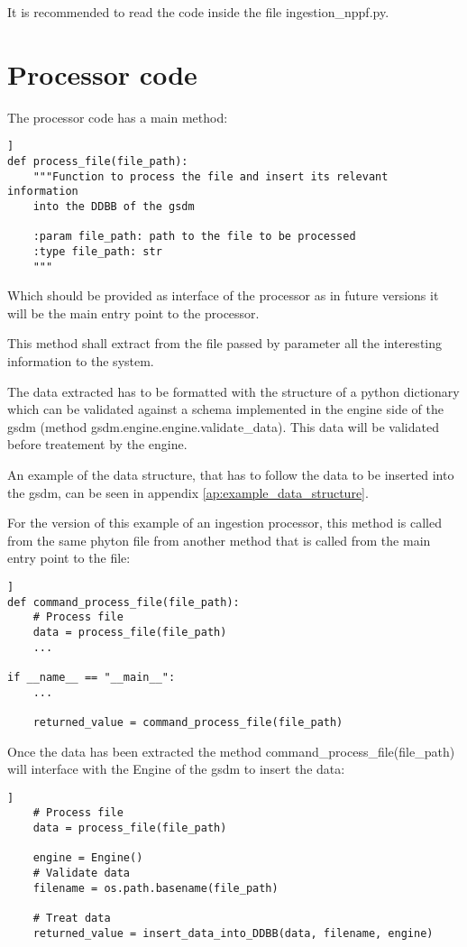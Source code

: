 It is recommended to read the code inside the file ingestion\_nppf.py.

\section{Processor code}

The processor code has a main method:

\begin{lstlisting}[breaklines=true, style=python]]
def process_file(file_path):
    """Function to process the file and insert its relevant information
    into the DDBB of the gsdm

    :param file_path: path to the file to be processed
    :type file_path: str
    """
\end{lstlisting}

Which should be provided as interface of the processor as in future versions it will be the main entry point to the processor.

This method shall extract from the file passed by parameter all the interesting information to the system.

The data extracted has to be formatted with the structure of a python dictionary which can be validated against a schema implemented in the engine side of the gsdm (method gsdm.engine.engine.validate\_data). This data will be validated before treatement by the engine.

An example of the data structure, that has to follow the data to be inserted into the gsdm, can be seen in appendix \ref{ap:example_data_structure}.

For the version of this example of an ingestion processor, this method is called from the same phyton file from another method that is called from the main entry point to the file:

\begin{lstlisting}[breaklines=true, style=python]]
def command_process_file(file_path):
    # Process file
    data = process_file(file_path)
    ...

if __name__ == "__main__":
    ...

    returned_value = command_process_file(file_path)
\end{lstlisting}

Once the data has been extracted the method command\_process\_file(file\_path) will interface with the Engine of the gsdm to insert the data:

\begin{lstlisting}[breaklines=true, style=python]]
    # Process file
    data = process_file(file_path)

    engine = Engine()
    # Validate data
    filename = os.path.basename(file_path)

    # Treat data
    returned_value = insert_data_into_DDBB(data, filename, engine)
\end{lstlisting}

